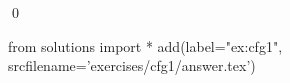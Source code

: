 
\begin{ex} 
  \label{ex:cfg1}
  
  \qed
\end{ex} 
\begin{python0}
from solutions import *
add(label="ex:cfg1",
    srcfilename='exercises/cfg1/answer.tex') 
\end{python0}
